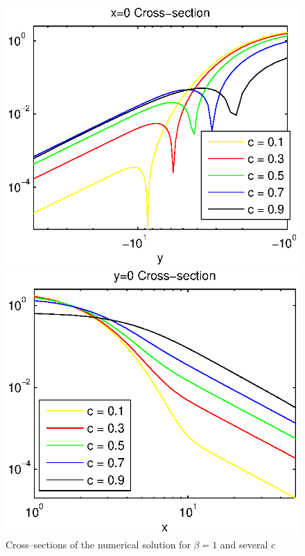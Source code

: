\documentclass{article}
\begin{document}
\begin{figure}[ht]
\begin{minipage}[b]{0.5\linewidth}
	\end{minipage}
	\begin{minipage}[b]{0.5\linewidth}
		\raggedleft
		\includegraphics[width=\linewidth]{../EllipticEquationSJC/cross-sections/c=01__09beta=1Logx=0.eps}
	\end{minipage}	
	\begin{minipage}[b]{0.5\linewidth}
		\raggedright
		 \includegraphics[width=\linewidth]{../EllipticEquationSJC/cross-sections/c=01__09beta=1Logy=0.eps}
	\end{minipage}
	\caption{Cross--sections of the numerical solution for $\beta=1$ and several  $c$}
	\label{profilesSpeedVarying}
\end{figure}
\end{document}

